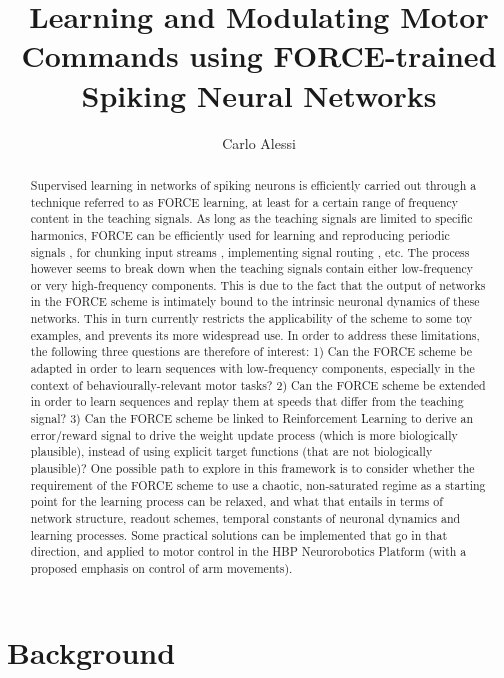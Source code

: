 \documentclass[10pt,a4paper, final]{report} %
\title{Learning and Modulating Motor Commands using FORCE-trained Spiking Neural Networks}
\author{Carlo Alessi}
\begin{document}
\maketitle

\begin{abstract}
Supervised learning in networks of spiking neurons is efficiently carried out through a technique referred to as FORCE learning, at least for a certain range of frequency content in the teaching signals. As long as the teaching signals are limited to specific harmonics, FORCE can be efficiently used for learning and reproducing periodic signals \cite{nicola2017supervised}, for chunking input streams \cite{asabuki2018interactive}, implementing signal routing \cite{hoerzer2012emergence}, etc. The process however seems to break down when the teaching signals contain either low-frequency or very high-frequency components. This is due to the fact that the output of networks in the FORCE scheme is intimately bound to the intrinsic neuronal dynamics of these networks. This in turn currently restricts the applicability of the scheme to some toy examples, and prevents its more widespread use. 
In order to address these limitations, the following three questions are therefore of interest:
1) Can the FORCE scheme be adapted in order to learn sequences with low-frequency components, especially in the context of behaviourally-relevant motor tasks? 
2) Can the FORCE scheme be extended in order to learn sequences and replay them at speeds that differ from the teaching signal?
3) Can the FORCE scheme be linked to Reinforcement Learning to derive an error/reward signal to drive the weight update process (which is more biologically plausible), instead of using explicit target functions (that are not biologically plausible)? 
One possible path to explore in this framework is to consider whether the requirement of the FORCE scheme to use a chaotic, non-saturated regime as a starting point for the learning process can be relaxed, and what that entails in terms of network structure, readout schemes, temporal constants of neuronal dynamics and learning processes. Some practical solutions can be implemented that go in that direction, and applied to motor control in the HBP Neurorobotics Platform (with a proposed emphasis on control of arm movements).
\end{abstract}

\tableofcontents

\chapter{Background}
\label{cap:background}
\end{document}
